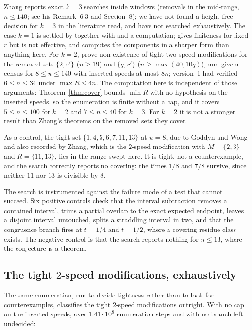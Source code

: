 \documentclass[11pt]{amsart}
\theoremstyle{plain}
\theoremstyle{definition}
\begin{document}
Zhang \cite{zhang} reports exact $k=3$ searches inside windows (removals in the mid-range, $n\le140$; see his Remark~6.3 and Section~8); we have not found a height-free decision for $k=3$ in the literature read, and have not searched exhaustively. The case $k=1$ is settled by \cite[Thm.~2.3]{gw} together with \cite[Thm.~1.2, Lemma~2.3]{zhang}
and a computation; \cite[Thm.~2.4]{gw} gives finiteness for fixed $r$ but is not effective, and
\cite[Thm.~1.4]{zhang} computes the components in a sharper form than anything here. For $k=2$,
\cite[Thms.~7.5, 7.10, 7.13]{zhang} prove non-existence of tight two-speed modifications for the removed
sets $\{2,r'\}$ ($n\ge19$) and $\{q,r'\}$ ($n\ge\max(40,10q)$), and give a census for $8\le n\le140$
with inserted speeds at most $8n$; version~1 had verified $6\le n\le34$ under $\max R\le4n$. The
computation here is independent of those arguments: Theorem~\ref{thm:cover} bounds $\min R$ with no
hypothesis on the inserted speeds, so the enumeration is finite without a cap, and it covers
$5\le n\le100$ for $k=2$ and $7\le n\le40$ for $k=3$. For $k=2$ it is not a stronger result than
Zhang's theorems on the removed sets they cover.

As a control, the tight set $\{1,4,5,6,7,11,13\}$ at $n=8$, due to Goddyn and Wong \cite{gw} and
also recorded by Zhang, which is the $2$-speed modification with $M=\{2,3\}$ and $R=\{11,13\}$, lies
in the range swept here. It is tight, not a counterexample,
and the search correctly reports no covering: the times $1/8$ and $7/8$ survive, since neither $11$
nor $13$ is divisible by $8$.

The search is instrumented against the failure mode of a test that cannot succeed. Six positive
controls check that the interval subtraction removes a contained interval, trims a partial overlap to
the exact expected endpoint, leaves a disjoint interval untouched, splits a straddling interval in
two, and that the congruence branch fires at $t=1/4$ and $t=1/2$, where a covering residue class
exists. The negative control is that the search reports nothing for $n\le13$, where the conjecture is
a theorem.


\subsection{The tight $2$-speed modifications, exhaustively}\label{sec:tight2}

The same enumeration, run to decide tightness rather than to look for counterexamples, classifies
the tight $2$-speed modifications outright. With no cap on the inserted speeds, over
$1.41\cdot10^{8}$ enumeration steps and with no branch left undecided:
\end{document}
